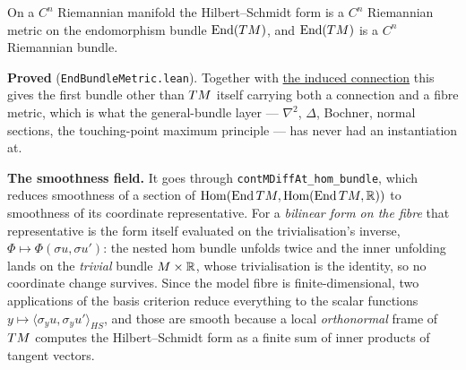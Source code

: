 \begin{lemma}
  \label{lem:end-bundle-metric}
  \leanok
  On a $C^n$ Riemannian manifold the Hilbert--Schmidt form is a $C^n$ Riemannian metric on the
  endomorphism bundle $\mathrm{End}(TM)$, and $\mathrm{End}(TM)$ is a $C^n$ Riemannian
  bundle.

  \textbf{Proved} (\texttt{EndBundleMetric.lean}). Together with
  \hyperref[lem:hom-bundle-connection]{the induced connection} this gives the first bundle
  other than $TM$ itself carrying both a connection and a fibre metric, which is what the
  general-bundle layer --- $\nabla^2$, $\Delta$, Bochner, normal sections, the touching-point
  maximum principle --- has never had an instantiation at.

  \textbf{The smoothness field.} It goes through \texttt{contMDiffAt\_hom\_bundle}, which
  reduces smoothness of a section of $\mathrm{Hom}(\mathrm{End}\,TM,
  \mathrm{Hom}(\mathrm{End}\,TM,\mathbb{R}))$ to smoothness of its coordinate representative. For a
  \emph{bilinear form on the fibre} that representative is the form itself evaluated on the
  trivialisation's inverse, $\Phi \mapsto \Phi(\sigma u, \sigma u')$: the nested hom bundle
  unfolds twice and the inner unfolding lands on the \emph{trivial} bundle $M \times \mathbb{R}$,
  whose trivialisation is the identity, so no coordinate change survives. Since the model
  fibre is finite-dimensional, two applications of the basis criterion reduce everything to
  the scalar functions $y \mapsto \langle \sigma_y u, \sigma_y u'\rangle_{HS}$, and those are
  smooth because a local \emph{orthonormal} frame of $TM$ computes the Hilbert--Schmidt form
  as a finite sum of inner products of tangent vectors.


\end{lemma}
